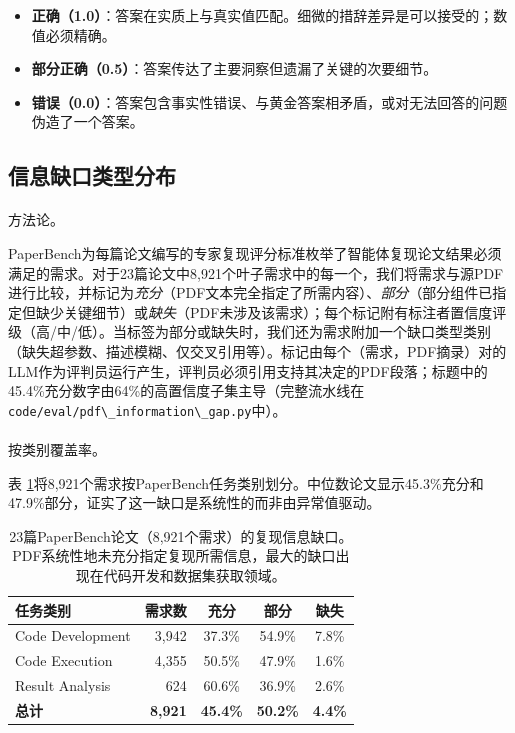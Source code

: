\documentclass[
]{article}
\makeatletter
\let\oldparagraph\paragraph
\renewcommand{\paragraph}{
    \@ifstar
      \xxxParagraphStar
      \xxxParagraphNoStar
  }
\newcommand{\xxxParagraphStar}[1]{\oldparagraph*{#1}\mbox{}}
\newcommand{\xxxParagraphNoStar}[1]{\oldparagraph{#1}\mbox{}}
\newcommand{\passthrough}[1]{#1}
\providecommand{\tightlist}{%
  \setlength{\itemsep}{0pt}\setlength{\parskip}{0pt}}
\theoremstyle{definition}
\makeatother
\begin{document}
\begin{itemize}
\tightlist
\item
  \textbf{正确（1.0）}：答案在实质上与真实值匹配。细微的措辞差异是可以接受的；数值必须精确。
\item
  \textbf{部分正确（0.5）}：答案传达了主要洞察但遗漏了关键的次要细节。
\item
  \textbf{错误（0.0）}：答案包含事实性错误、与黄金答案相矛盾，或对无法回答的问题伪造了一个答案。
\end{itemize}

\subsection{信息缺口类型分布}\label{sec-app-gap-types}

\paragraph{方法论。}\label{ux65b9ux6cd5ux8bba}

PaperBench为每篇论文编写的专家复现评分标准枚举了智能体复现论文结果必须满足的需求。对于23篇论文中8,921个叶子需求中的每一个，我们将需求与源PDF进行比较，并标记为\emph{充分}（PDF文本完全指定了所需内容）、\emph{部分}（部分组件已指定但缺少关键细节）或\emph{缺失}（PDF未涉及该需求）；每个标记附有标注者置信度评级（高/中/低）。当标签为部分或缺失时，我们还为需求附加一个缺口类型类别（缺失超参数、描述模糊、仅交叉引用等）。标记由每个（需求，PDF摘录）对的LLM作为评判员运行产生，评判员必须引用支持其决定的PDF段落；标题中的45.4\%充分数字由64\%的高置信度子集主导（完整流水线在\passthrough{\lstinline!code/eval/pdf\_information\_gap.py!}中）。

\paragraph{按类别覆盖率。}\label{ux6309ux7c7bux522bux8986ux76d6ux7387}

表
\ref{tbl-info-gap}将8,921个需求按PaperBench任务类别划分。中位数论文显示45.3\%充分和47.9\%部分，证实了这一缺口是系统性的而非由异常值驱动。

\begin{table}[htbp]
\centering
\small
\begin{tabular}{lrccc}
\toprule
\textbf{任务类别} & \textbf{需求数} & \textbf{充分} & \textbf{部分} & \textbf{缺失} \\
\midrule
Code Development & 3,942 & 37.3\% & 54.9\% & 7.8\% \\
Code Execution & 4,355 & 50.5\% & 47.9\% & 1.6\% \\
Result Analysis & 624 & 60.6\% & 36.9\% & 2.6\% \\
\textbf{总计} & \textbf{8,921} & \textbf{45.4\%} & \textbf{50.2\%} & \textbf{4.4\%} \\
\bottomrule
\end{tabular}
\caption[复现信息缺口]{23篇PaperBench论文（8,921个需求）的复现信息缺口。PDF系统性地未充分指定复现所需信息，最大的缺口出现在代码开发和数据集获取领域。}
\label{tbl-info-gap}
\end{table}
\end{document}
